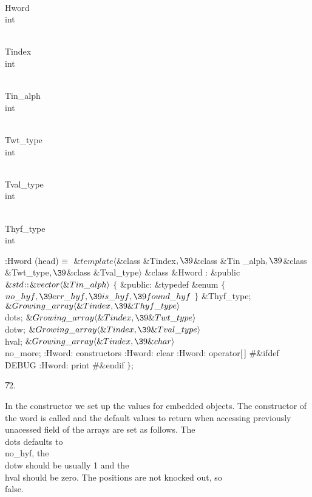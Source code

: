\Y\B\F\\{Hword} \5
\\{int}\par
\B\F\\{Tindex} \5
\\{int}\par
\B\F\\{Tin\_alph} \5
\\{int}\par
\B\F\\{Twt\_type} \5
\\{int}\par
\B\F\\{Tval\_type} \5
\\{int}\par
\B\F\\{Thyf\_type} \5
\\{int}\par
\Y\B\4:Hword (head)\X${}\equiv{}$\6
$\&{template}\langle{}$\&{class} \&{Tindex}${},\39{}$\&{class} \&{Tin%
\_alph}${},\39{}$\&{class} \&{Twt\_type}${},\39{}$\&{class} \&{Tval\_type}${}%
\rangle{}$\6
\&{class} \&{Hword} :\6
\&{public} ${}\&{std}\kern.1em{::}\kern.1em\&{vector}\langle\&{Tin\_alph}\rangle{}$ ${}\{{}$\1\6
\4\&{public}:\6
\&{typedef} \&{enum} ${}\{{}$\1\6
${}\\{no\_hyf},\39\\{err\_hyf},\39\\{is\_hyf},\39\\{found\_hyf}{}$\2\6
${}\}{}$ \&{Thyf\_type};\7
${}\&{Growing\_array}\langle\&{Tindex},\39\&{Thyf\_type}\rangle{}$ \\{dots};\6
${}\&{Growing\_array}\langle\&{Tindex},\39\&{Twt\_type}\rangle{}$ \\{dotw};\6
${}\&{Growing\_array}\langle\&{Tindex},\39\&{Tval\_type}\rangle{}$ \\{hval};\6
${}\&{Growing\_array}\langle\&{Tindex},\39\&{char}\rangle{}$ \\{no\_more};\7
:Hword: constructors\X\6
:Hword: clear\X\6
:Hword: operator[\,]\X\6
\8\#\&{ifdef} \.{DEBUG}\6
:Hword: print\X{}\6
\8\#\&{endif}\2\6
${}\}{}$;\par
\U72.\fi

In the constructor we set up the values for embedded objects. The
constructor of the word is called and the default values to return when
accessing previously unacessed field of the arrays are set as follows.
The \\{dots} defaults to \\{no\_hyf}, the \\{dotw} should be usually 1 and the
\\{hval} should be zero. The positions are not knocked out, so \\{false}.

